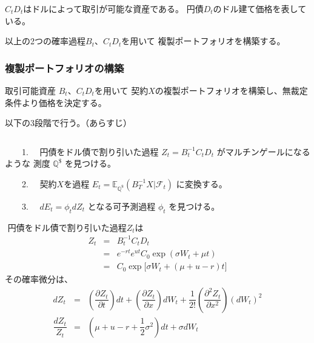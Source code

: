 \documentclass[uplatex,a4j,12pt,dvipdfmx]{jsarticle}
\begin{document}
${}$

$C_{t} D_{t}$はドルによって取引が可能な資産である。
円債$D_{t}$のドル建て価格を表している。

以上の2つの確率過程$B_{t}$、$C_{t}D_{t}$を用いて
複製ポートフォリオを構築する。
\subsubsection{複製ポートフォリオの構築}

取引可能資産
$B_{t}$、$C_{t}D_{t}$を用いて
契約$X$の複製ポートフォリオを構築し、無裁定条件より価格を決定する。

以下の3段階で行う。（あらすじ）

${}$

\ \ \ \ 1. \ \ 円債をドル債で割り引いた過程
$Z_{t} = B^{-1}_{t} C_{t} D_{t}$
がマルチンゲールになるような
測度
$\mathbb{Q}^{\$}$
を見つける。

\ \ \ \ 2. \ \
契約$X$を過程
$E_{t} = \mathbb{E}_{\mathbb{Q}^{\$}}(B_{T}^{-1}X|\mathcal{F}_{t})$
に変換する。

\ \ \ \ 3. \ \
$dE_{t}=\phi_{t} dZ_{t}$
となる可予測過程
$\phi_{t}$
を見つける。

${}$
円債をドル債で割り引いた過程$Z_{t}$は
%
%
\begin{eqnarray*}
	Z_{t}
	&=&
	B^{-1}_{t} C_{t} D_{t}
	\\ &=&
	e^{-rt} e^{ut} C_{0} \exp (\sigma W_{t} + \mu t )
	\\ &=&
	C_{0} \exp \big[ \sigma W_{t} + (\mu + u - r)t \big]
\end{eqnarray*}
%
%
その確率微分は、
%
%
\begin{eqnarray*}
	d Z_{t}
	&=&
	\left(
	\dfrac{\partial Z_{t}}{\partial t}
	\right)
	dt
	+
	\left(
	\dfrac{\partial Z_{t}}{\partial x}
	\right)
	d W_{t}
	+
	\dfrac{1}{2!}
	\left(
	\dfrac{\partial^{2} Z_{t}}{\partial x^{2}}
	\right)
	(d W_{t})^{2}
	\\
	\dfrac{dZ_{t}}{Z_{t}}
	&=&
	\left(
	\mu + u - r + \dfrac{1}{2} \sigma^{2}
	\right)
	dt
	+
	\sigma d W_{t}
\end{eqnarray*}
%
%
\end{document}
